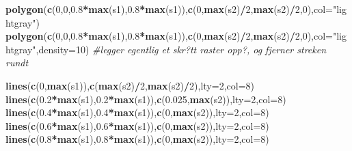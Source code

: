 \documentclass[]{article}
\newenvironment{Shaded}{\begin{snugshade}}{\end{snugshade}}
\newcommand{\CommentTok}[1]{\textcolor[rgb]{0.56,0.35,0.01}{\textit{#1}}}
\newcommand{\DataTypeTok}[1]{\textcolor[rgb]{0.13,0.29,0.53}{#1}}
\newcommand{\DecValTok}[1]{\textcolor[rgb]{0.00,0.00,0.81}{#1}}
\newcommand{\FloatTok}[1]{\textcolor[rgb]{0.00,0.00,0.81}{#1}}
\newcommand{\KeywordTok}[1]{\textcolor[rgb]{0.13,0.29,0.53}{\textbf{#1}}}
\newcommand{\NormalTok}[1]{#1}
\newcommand{\OperatorTok}[1]{\textcolor[rgb]{0.81,0.36,0.00}{\textbf{#1}}}
\newcommand{\StringTok}[1]{\textcolor[rgb]{0.31,0.60,0.02}{#1}}
\begin{document}
\begin{Shaded}
\begin{Highlighting}[]
\KeywordTok{polygon}\NormalTok{(}\KeywordTok{c}\NormalTok{(}\DecValTok{0}\NormalTok{,}\DecValTok{0}\NormalTok{,}\FloatTok{0.8}\OperatorTok{*}\KeywordTok{max}\NormalTok{(s1),}\FloatTok{0.8}\OperatorTok{*}\KeywordTok{max}\NormalTok{(s1)),}\KeywordTok{c}\NormalTok{(}\DecValTok{0}\NormalTok{,}\KeywordTok{max}\NormalTok{(s2)}\OperatorTok{/}\DecValTok{2}\NormalTok{,}\KeywordTok{max}\NormalTok{(s2)}\OperatorTok{/}\DecValTok{2}\NormalTok{,}\DecValTok{0}\NormalTok{),}\DataTypeTok{col=}\StringTok{"lightgray"}\NormalTok{)}
\KeywordTok{polygon}\NormalTok{(}\KeywordTok{c}\NormalTok{(}\DecValTok{0}\NormalTok{,}\DecValTok{0}\NormalTok{,}\FloatTok{0.8}\OperatorTok{*}\KeywordTok{max}\NormalTok{(s1),}\FloatTok{0.8}\OperatorTok{*}\KeywordTok{max}\NormalTok{(s1)),}\KeywordTok{c}\NormalTok{(}\DecValTok{0}\NormalTok{,}\KeywordTok{max}\NormalTok{(s2)}\OperatorTok{/}\DecValTok{2}\NormalTok{,}\KeywordTok{max}\NormalTok{(s2)}\OperatorTok{/}\DecValTok{2}\NormalTok{,}\DecValTok{0}\NormalTok{),}\DataTypeTok{col=}\StringTok{"lightgray"}\NormalTok{,}\DataTypeTok{density=}\DecValTok{10}\NormalTok{) }\CommentTok{#legger egentlig et skr?tt raster opp?, og fjerner streken rundt}

\KeywordTok{lines}\NormalTok{(}\KeywordTok{c}\NormalTok{(}\DecValTok{0}\NormalTok{,}\KeywordTok{max}\NormalTok{(s1)),}\KeywordTok{c}\NormalTok{(}\KeywordTok{max}\NormalTok{(s2)}\OperatorTok{/}\DecValTok{2}\NormalTok{,}\KeywordTok{max}\NormalTok{(s2)}\OperatorTok{/}\DecValTok{2}\NormalTok{),}\DataTypeTok{lty=}\DecValTok{2}\NormalTok{,}\DataTypeTok{col=}\DecValTok{8}\NormalTok{)}
\KeywordTok{lines}\NormalTok{(}\KeywordTok{c}\NormalTok{(}\FloatTok{0.2}\OperatorTok{*}\KeywordTok{max}\NormalTok{(s1),}\FloatTok{0.2}\OperatorTok{*}\KeywordTok{max}\NormalTok{(s1)),}\KeywordTok{c}\NormalTok{(}\FloatTok{0.025}\NormalTok{,}\KeywordTok{max}\NormalTok{(s2)),}\DataTypeTok{lty=}\DecValTok{2}\NormalTok{,}\DataTypeTok{col=}\DecValTok{8}\NormalTok{)}
\KeywordTok{lines}\NormalTok{(}\KeywordTok{c}\NormalTok{(}\FloatTok{0.4}\OperatorTok{*}\KeywordTok{max}\NormalTok{(s1),}\FloatTok{0.4}\OperatorTok{*}\KeywordTok{max}\NormalTok{(s1)),}\KeywordTok{c}\NormalTok{(}\DecValTok{0}\NormalTok{,}\KeywordTok{max}\NormalTok{(s2)),}\DataTypeTok{lty=}\DecValTok{2}\NormalTok{,}\DataTypeTok{col=}\DecValTok{8}\NormalTok{)}
\KeywordTok{lines}\NormalTok{(}\KeywordTok{c}\NormalTok{(}\FloatTok{0.6}\OperatorTok{*}\KeywordTok{max}\NormalTok{(s1),}\FloatTok{0.6}\OperatorTok{*}\KeywordTok{max}\NormalTok{(s1)),}\KeywordTok{c}\NormalTok{(}\DecValTok{0}\NormalTok{,}\KeywordTok{max}\NormalTok{(s2)),}\DataTypeTok{lty=}\DecValTok{2}\NormalTok{,}\DataTypeTok{col=}\DecValTok{8}\NormalTok{)}
\KeywordTok{lines}\NormalTok{(}\KeywordTok{c}\NormalTok{(}\FloatTok{0.8}\OperatorTok{*}\KeywordTok{max}\NormalTok{(s1),}\FloatTok{0.8}\OperatorTok{*}\KeywordTok{max}\NormalTok{(s1)),}\KeywordTok{c}\NormalTok{(}\DecValTok{0}\NormalTok{,}\KeywordTok{max}\NormalTok{(s2)),}\DataTypeTok{lty=}\DecValTok{2}\NormalTok{,}\DataTypeTok{col=}\DecValTok{8}\NormalTok{)}


\end{Highlighting}
\end{Shaded}
\end{document}
